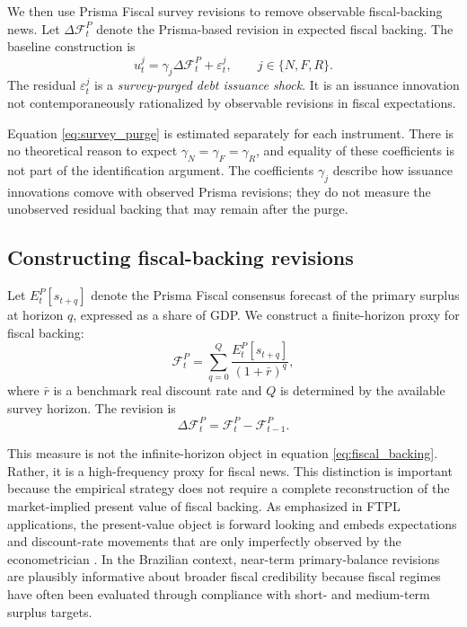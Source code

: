 \documentclass[12pt,a4paper]{article}
\begin{document}
We then use Prisma Fiscal survey revisions to remove observable fiscal-backing news. Let \(\Delta \mathcal{F}_t^{P}\) denote the Prisma-based revision in expected fiscal backing. The baseline construction is
\begin{equation}
u_t^j
=
\gamma_j \Delta \mathcal{F}_t^{P}
+
\varepsilon_t^j,
\qquad
j\in\{N,F,R\}.
\label{eq:survey_purge}
\end{equation}
The residual \(\varepsilon_t^j\) is a \emph{survey-purged debt issuance shock}. It is an issuance innovation not contemporaneously rationalized by observable revisions in fiscal expectations.

Equation \eqref{eq:survey_purge} is estimated separately for each instrument. There is no theoretical reason to expect \(\gamma_N=\gamma_F=\gamma_R\), and equality of these coefficients is not part of the identification argument. The coefficients \(\gamma_j\) describe how issuance innovations comove with observed Prisma revisions; they do not measure the unobserved residual backing that may remain after the purge.

\subsection{Constructing fiscal-backing revisions}

Let \(E_t^P[s_{t+q}]\) denote the Prisma Fiscal consensus forecast of the primary surplus at horizon \(q\), expressed as a share of GDP. We construct a finite-horizon proxy for fiscal backing:
\begin{equation}
\mathcal{F}_t^{P}
=
\sum_{q=0}^{Q}
\frac{E_t^P[s_{t+q}]}{(1+\bar r)^q},
\label{eq:prisma_pv}
\end{equation}
where \(\bar r\) is a benchmark real discount rate and \(Q\) is determined by the available survey horizon. The revision is
\begin{equation}
\Delta \mathcal{F}_t^{P}
=
\mathcal{F}_t^{P}-\mathcal{F}_{t-1}^{P}.
\label{eq:prisma_revision}
\end{equation}


This measure is not the infinite-horizon object in equation \eqref{eq:fiscal_backing}. Rather, it is a high-frequency proxy for fiscal news. This distinction is important because the empirical strategy does not require a complete reconstruction of the market-implied present value of fiscal backing. As emphasized in FTPL applications, the present-value object is forward looking and embeds expectations and discount-rate movements that are only imperfectly observed by the econometrician \citep{Cochrane2023,Cochrane2026}. In the Brazilian context, near-term primary-balance revisions are plausibly informative about broader fiscal credibility because fiscal regimes have often been evaluated through compliance with short- and medium-term surplus targets.
\end{document}
